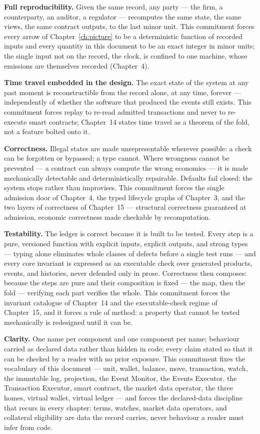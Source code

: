 \documentclass[11pt,a4paper]{article}
\begin{document}
\textbf{Full reproducibility.} Given the same record, any party --- the firm, a
counterparty, an auditor, a regulator --- recomputes the same state, the same views,
the same contract outputs, to the last minor unit. This commitment forces every arrow
of Chapter~\ref{ch:picture} to be a deterministic function of recorded inputs and
every quantity in this document to be an exact integer in minor units; the single
input not on the record, the clock, is confined to one machine, whose emissions are
themselves recorded (Chapter~4).

\textbf{Time travel embedded in the design.} The exact state of the system at any past
moment is reconstructible from the record alone, at any time, forever ---
independently of whether the software that produced the events still exists. This
commitment forces replay to re-read admitted transactions and never to re-execute
smart contracts; Chapter~14 states time travel as a theorem of the fold, not a feature
bolted onto it.

\textbf{Correctness.} Illegal states are made unrepresentable wherever possible: a
check can be forgotten or bypassed; a type cannot. Where wrongness cannot be prevented
--- a contract can always compute the wrong economics --- it is made mechanically
detectable and deterministically repairable. Defaults fail closed: the system stops
rather than improvises. This commitment forces the single admission door of
Chapter~4, the typed lifecycle graphs of Chapter~3, and the two layers of correctness
of Chapter~15 --- structural correctness guaranteed at admission, economic correctness
made checkable by recomputation.

\textbf{Testability.} The ledger is correct because it is built to be tested. Every
step is a pure, versioned function with explicit inputs, explicit outputs, and strong
types --- typing alone eliminates whole classes of defects before a single test runs
--- and every core invariant is expressed as an executable check over generated
products, events, and histories, never defended only in prose. Correctness then
composes: because the steps are pure and their composition is fixed --- the map, then
the fold --- verifying each part verifies the whole. This commitment forces the
invariant catalogue of Chapter~14 and the executable-check regime of Chapter~15, and
it forces a rule of method: a property that cannot be tested mechanically is
redesigned until it can be.

\textbf{Clarity.} One name per component and one component per name; behaviour carried
as declared data rather than hidden in code; every claim stated so that it can be
checked by a reader with no prior exposure. This commitment fixes the vocabulary of
this document --- unit, wallet, balance, move, transaction, watch, the immutable log,
projection, the Event Monitor, the Events Executor, the Transaction Executor, smart
contract, the market data operator, the three homes, virtual wallet, virtual ledger
--- and forces the declared-data discipline that recurs in every chapter: terms,
watches, market data operators, and collateral eligibility are data the record
carries, never behaviour a reader must infer from code.
\end{document}
